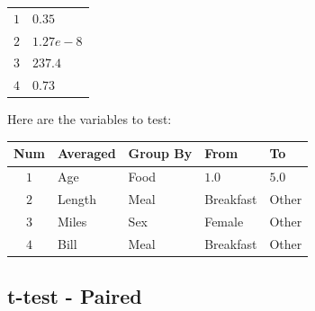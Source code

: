 \begin{center}
  \begin{tabular}{ll}
    $ 1 $ & $ 0.35 $ \\ 
    $ 2 $ & $ 1.27e-8 $ \\ 
    $ 3 $ & $ 237.4 $ \\ 
    $ 4 $ & $ 0.73 $ \\ 
  \end{tabular} 
\end{center}

Here are the variables to test:

\begin{center}
  \begin{tabular}{cllll}
    \hline 
    \textbf{Num} & \textbf{Averaged} & \textbf{Group By} & \textbf{From} & \textbf{To} \\ 
    \hline 
    $ 1 $ & Age & Food & $ 1.0 $ & $ 5.0 $ \\ 
    $ 2 $ & Length & Meal & Breakfast & Other \\ 
    $ 3 $ & Miles & Sex & Female & Other \\ 
    $ 4 $ & Bill & Meal & Breakfast & Other \\ 
    \hline 
  \end{tabular} 
\end{center}

\subsection{t-test - Paired}

